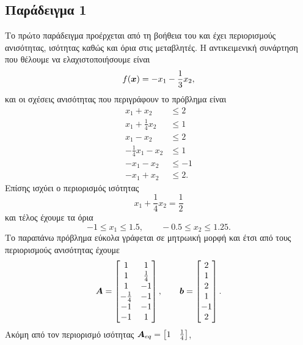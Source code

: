 \subsection{Παράδειγμα 1}
Το πρώτο παράδειγμα προέρχεται από τη βοήθεια του  και έχει
περιορισμούς ανισότητας, ισότητας καθώς και όρια στις μεταβλητές.
Η αντικειμενική συνάρτηση που θέλουμε να ελαχιστοποιήσουμε είναι
\begin{equation*}
    f(\bm{x}) = -x_1 - \frac{1}{3}x_2,
\end{equation*}
και οι σχέσεις ανισότητας που περιγράφουν το πρόβλημα είναι
\begin{align*}
    x_1 + x_2 &\leq 2 \\
    x_1 + \frac{1}{4}x_2 &\leq 1 \\
    x_1 - x_2 &\leq 2 \\
    -\frac{1}{4}x_1 - x_2 &\leq 1 \\
    -x_1 - x_2 &\leq -1 \\
    -x_1 + x_2 &\leq 2.
\end{align*}
Επίσης ισχύει ο περιορισμός ισότητας
\begin{equation*}
    x_1 + \frac{1}{4}x_2 = \frac{1}{2}
\end{equation*}
και τέλος έχουμε τα όρια
\begin{equation*}
    -1 \leq x_1 \leq 1.5, \qquad -0.5 \leq x_2 \leq 1.25.
\end{equation*}
Το παραπάνω πρόβλημα εύκολα γράφεται σε μητρωική μορφή και έτσι από τους περιορισμούς ανισότητας έχουμε
\begin{equation*}
    \boldsymbol{A} =
    \begin{bmatrix}
        1 & 1 \\
        1 & \frac{1}{4} \\
        1 & -1 \\
        -\frac{1}{4} & -1 \\
        -1 & -1 \\
        -1 & 1
    \end{bmatrix}, \qquad
    \bm{b} =
    \begin{bmatrix}
        2\\ 1\\ 2\\ 1\\ -1\\ 2
    \end{bmatrix}.
\end{equation*}
Ακόμη από τον περιορισμό ισότητας $\boldsymbol{A}_{eq} = \begin{bmatrix}1 & \frac{1}{4}\end{bmatrix}$,
